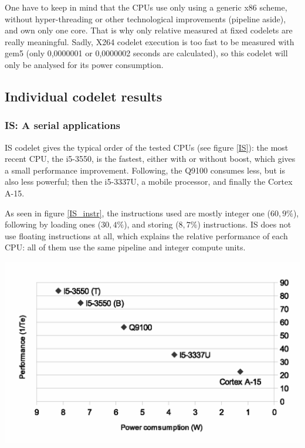 \documentclass{article}
\newenvironment{Figure}
  {\par\medskip\noindent\center\minipage{0.9\linewidth}}
  {\endminipage\par\bigskip\medskip}
\begin{document}
\begin{multicols}{2}
One have to keep in mind that the CPUs use only using a generic x86 scheme, without hyper-threading or other technological improvements (pipeline aside), and own only one core. That is why only relative measured at fixed codelets are really meaningful.
\newpage %
Sadly, X264 codelet execution is too fast to be measured with gem5 (only 0,0000001 or 0,0000002 seconds are calculated), so this codelet will only be analysed for its power consumption.


\subsection{Individual codelet results}

\subsubsection{IS: A serial applications}
IS codelet gives the typical order of the tested CPUs (see figure \ref{IS}): the most recent CPU, the i5-3550, is the fastest, either with or without boost, which gives a small performance improvement. Following, the Q9100 consumes less, but is also less powerful; then the i5-3337U, a mobile processor, and finally the Cortex A-15.

As seen in figure \ref{IS_instr}, the instructions used are mostly integer one ($60,9\%$), following by loading ones ($30,4\%$), and storing ($8,7\%$) instructions. IS does not use floating instructions at all, which explains the relative performance of each CPU: all of them use the same pipeline and integer compute units.
\begin{Figure}
\centering
\includegraphics[width=\linewidth]{IS.eps}
\end{Figure}


\end{multicols}
\end{document}
